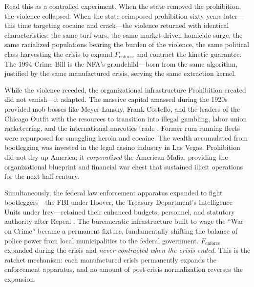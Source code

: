 \documentclass[12pt,openany]{book}
\begin{document}
Read this as a controlled experiment. When the state removed the prohibition, the violence collapsed. When the state reimposed prohibition sixty years later---this time targeting cocaine and crack---the violence returned with identical characteristics: the same turf wars, the same market-driven homicide surge, the same racialized populations bearing the burden of the violence, the same political class harvesting the crisis to expand $F_{\text{enforce}}$ and contract the kinetic guarantee. The 1994 Crime Bill is the NFA's grandchild---born from the same algorithm, justified by the same manufactured crisis, serving the same extraction kernel.

While the violence receded, the organizational infrastructure Prohibition created did not vanish---it adapted. The massive capital amassed during the 1920s provided mob bosses like Meyer Lansky, Frank Costello, and the leaders of the Chicago Outfit with the resources to transition into illegal gambling, labor union racketeering, and the international narcotics trade \cite{pbs_gangsters}. Former rum-running fleets were repurposed for smuggling heroin and cocaine. The wealth accumulated from bootlegging was invested in the legal casino industry in Las Vegas. Prohibition did not dry up America; it \textit{corporatized} the American Mafia, providing the organizational blueprint and financial war chest that sustained illicit operations for the next half-century.

Simultaneously, the federal law enforcement apparatus expanded to fight bootleggers---the FBI under Hoover, the Treasury Department's Intelligence Units under Irey---retained their enhanced budgets, personnel, and statutory authority after Repeal \cite{fbi_gangster}. The bureaucratic infrastructure built to wage the ``War on Crime'' became a permanent fixture, fundamentally shifting the balance of police power from local municipalities to the federal government. $F_{\text{enforce}}$ expanded during the crisis and \textit{never contracted when the crisis ended}. This is the ratchet mechanism: each manufactured crisis permanently expands the enforcement apparatus, and no amount of post-crisis normalization reverses the expansion.
\end{document}
